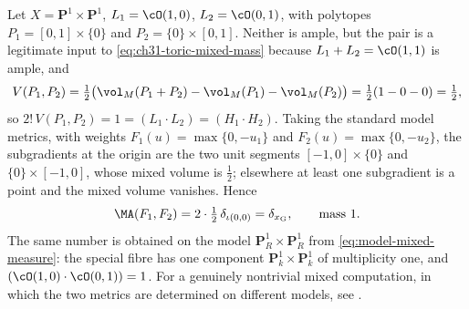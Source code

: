 \begin{example}
\label{ex:ch31-toric-mixed-numbers}
Let \(X=\mathbf P^1\times\mathbf P^1\), \(L_1=\cO(1,0)\),
\(L_2=\cO(0,1)\), with polytopes \(P_1=[0,1]\times\{0\}\) and
\(P_2=\{0\}\times[0,1]\).  Neither is ample, but the pair is a legitimate
input to \eqref{eq:ch31-toric-mixed-mass} because
\(L_1+L_2=\cO(1,1)\) is ample, and
\[
 V(P_1,P_2)=\tfrac12\bigl(\vol_M(P_1+P_2)-\vol_M(P_1)-\vol_M(P_2)\bigr)
 =\tfrac12(1-0-0)=\tfrac12 ,
\]
so \(2!\,V(P_1,P_2)=1=(L_1\cdot L_2)=(H_1\cdot H_2)\).  Taking the standard
model metrics, with weights \(F_1(u)=\max\{0,-u_1\}\) and
\(F_2(u)=\max\{0,-u_2\}\), the subgradients at the origin are the two unit
segments \([-1,0]\times\{0\}\) and \(\{0\}\times[-1,0]\), whose mixed volume
is \(\tfrac12\); elsewhere at least one subgradient is a point and the mixed
volume vanishes.  Hence
\[
 \MA(F_1,F_2)=2\cdot\tfrac12\,\delta_{\iota(0,0)}=\delta_{x_{\mathrm G}},
 \qquad\text{mass }1 .
\]
The same number is obtained on the model \(\mathbf P^1_R\times\mathbf P^1_R\)
from \eqref{eq:model-mixed-measure}: the special fibre has one component
\(\mathbf P^1_k\times\mathbf P^1_k\) of multiplicity one, and
\((\cO(1,0)\cdot\cO(0,1))=1\).  For a genuinely nontrivial mixed
computation, in which the two metrics are determined on different models,
see .
\end{example}

